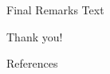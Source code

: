 \documentclass{beamer}
\begin{document}
    \begin{frame}{Final Remarks}
        Text
    \end{frame}


    {
    \begin{frame}[standout]
        Thank you!
    \end{frame}
    }

    \appendix

    \begin{frame}[allowframebreaks]{References}
        \printbibliography[heading=none]
    \end{frame}
\end{document}
